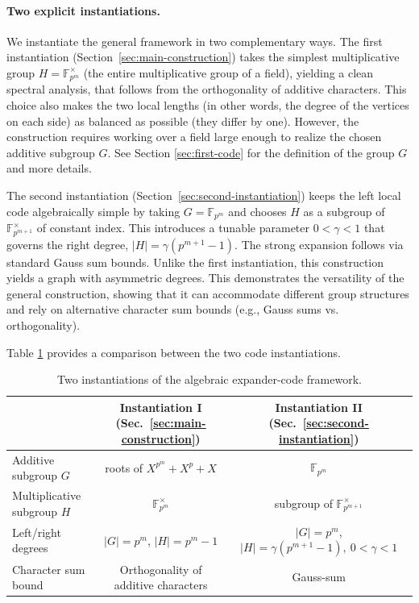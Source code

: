 \documentclass[11pt]{article}
\theoremstyle{plain}
\theoremstyle{definition}
\begin{document}
\paragraph{Two explicit instantiations.}
We instantiate the general framework in two complementary ways.
The first instantiation (Section~\ref{sec:main-construction}) takes the simplest multiplicative group $H=\mathbb{F}_{p^m}^\times$ (the entire multiplicative group of a field), yielding a clean spectral analysis, that follows from the orthogonality of additive characters.
This choice also makes the two local lengths (in other words, the degree of the vertices on each side) as balanced as possible (they differ by one). However, the construction requires working over a field large enough to realize the chosen additive subgroup $G$. See Section \ref{sec:first-code} for the definition of the group $G$ and more details.


 The second instantiation (Section~\ref{sec:second-instantiation}) keeps the left local code algebraically simple by taking $G=\mathbb{F}_{p^m}$ and chooses $H$ as a subgroup of $\mathbb{F}_{p^{m+1}}^\times$ of constant index. This introduces a tunable parameter $0<\gamma<1$ that governs the right degree, $|H|=\gamma(p^{m+1}-1)$. The strong expansion  follows  via standard Gauss sum bounds. Unlike the first instantiation, this construction yields a graph with asymmetric degrees. This demonstrates the versatility of the general construction, showing that it can accommodate different group structures and rely on alternative character sum bounds (e.g., Gauss sums vs. orthogonality).

Table \ref{tab:two-instantiations} provides a comparison between the two code instantiations.
\begin{table}[t]
\centering
\scriptsize
\begin{tabular}{lcc}
\hline
 & \textbf{Instantiation I (Sec.~\ref{sec:main-construction})} & \textbf{Instantiation II (Sec.~\ref{sec:second-instantiation})} \\
\hline
Additive subgroup $G$ & roots of $X^{p^m}+X^p+X$ & $\mathbb{F}_{p^m}$ \\
Multiplicative subgroup $H$ & $\mathbb{F}_{p^m}^\times$ & subgroup of $\mathbb{F}_{p^{m+1}}^\times$  \\
Left/right degrees & $|G|=p^m$, $|H|=p^m-1$ & $|G|=p^m$, $|H|=\gamma(p^{m+1}-1),\ 0<\gamma<1$ \\
Character sum bound & Orthogonality of additive characters & Gauss-sum  \\
\hline
\end{tabular}
\caption{Two instantiations of the algebraic expander-code framework.}
\label{tab:two-instantiations}
\end{table}
\end{document}
